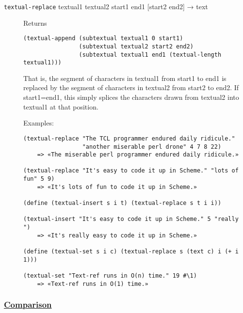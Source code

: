 \begin{description}
\item[ \href{}{} \texttt{textual-replace} textual1 textual2 start1 end1
{[}start2 end2{]} → text ]
Returns

\begin{verbatim}
(textual-append (subtextual textual1 0 start1)
                (subtextual textual2 start2 end2)
                (subtextual textual1 end1 (textual-length textual1)))
\end{verbatim}

That is, the segment of characters in textual1 from start1 to end1 is
replaced by the segment of characters in textual2 from start2 to end2.
If start1=end1, this simply splices the characters drawn from textual2
into textual1 at that position.

Examples:

\begin{verbatim}
(textual-replace "The TCL programmer endured daily ridicule."
                 "another miserable perl drone" 4 7 8 22)
    => «The miserable perl programmer endured daily ridicule.»

(textual-replace "It's easy to code it up in Scheme." "lots of fun" 5 9)
    => «It's lots of fun to code it up in Scheme.»

(define (textual-insert s i t) (textual-replace s t i i))

(textual-insert "It's easy to code it up in Scheme." 5 "really ")
    => «It's really easy to code it up in Scheme.»

(define (textual-set s i c) (textual-replace s (text c) i (+ i 1)))

(textual-set "Text-ref runs in O(n) time." 19 #\1)
    => «Text-ref runs in O(1) time.»
\end{verbatim}
\end{description}

\subsubsection{\texorpdfstring{\href{}{Comparison}}{Comparison}}\label{comparison}

